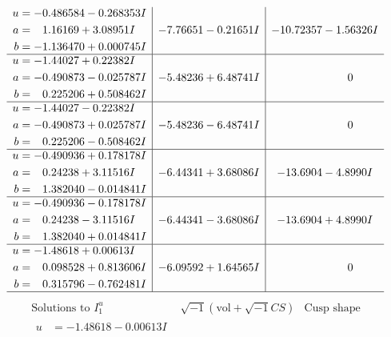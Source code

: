 \documentclass[1p]{elsarticle_modified}
\theoremstyle{definition}
\newcommand{\I}{\sqrt{-1}}
\begin{document}
$$\begin{array}{c|c|c}
\begin{aligned}
u &= -0.486584 - 0.268353 I \\
a &= \phantom{-}1.16169 + 3.08951 I \\
b &= -1.136470 + 0.000745 I\end{aligned}
 & -7.76651 - 0.21651 I & -10.72357 - 1.56326 I \\ \hline\begin{aligned}
u &= -1.44027 + 0.22382 I \\
a &= -0.490873 - 0.025787 I \\
b &= \phantom{-}0.225206 + 0.508462 I\end{aligned}
 & -5.48236 + 6.48741 I & \phantom{-0.000000 } 0 \\ \hline\begin{aligned}
u &= -1.44027 - 0.22382 I \\
a &= -0.490873 + 0.025787 I \\
b &= \phantom{-}0.225206 - 0.508462 I\end{aligned}
 & -5.48236 - 6.48741 I & \phantom{-0.000000 } 0 \\ \hline\begin{aligned}
u &= -0.490936 + 0.178178 I \\
a &= \phantom{-}0.24238 + 3.11516 I \\
b &= \phantom{-}1.382040 - 0.014841 I\end{aligned}
 & -6.44341 + 3.68086 I & -13.6904 - 4.8990 I \\ \hline\begin{aligned}
u &= -0.490936 - 0.178178 I \\
a &= \phantom{-}0.24238 - 3.11516 I \\
b &= \phantom{-}1.382040 + 0.014841 I\end{aligned}
 & -6.44341 - 3.68086 I & -13.6904 + 4.8990 I \\ \hline\begin{aligned}
u &= -1.48618 + 0.00613 I \\
a &= \phantom{-}0.098528 + 0.813606 I \\
b &= \phantom{-}0.315796 - 0.762481 I\end{aligned}
 & -6.09592 + 1.64565 I & \phantom{-0.000000 } 0\\
 \hline 
 \end{array}$$\newpage$$\begin{array}{c|c|c}  
\text{Solutions to }I^u_{1}& \I (\text{vol} + \sqrt{-1}CS) & \text{Cusp shape}\\
 \hline 
\begin{aligned}
u &= -1.48618 - 0.00613 I \\

\end{aligned}
\end{array}$$
\end{document}
